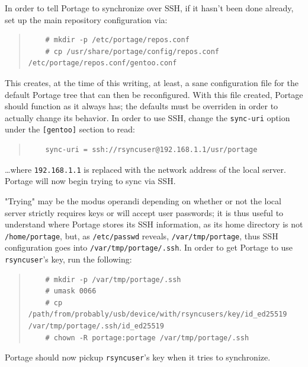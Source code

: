 \documentclass{article}
\begin{document}
In order to tell Portage to synchronize over SSH, if it hasn't been done already, set up the main repository configuration via:
\begin{quote}
\begin{verbatim}
	# mkdir -p /etc/portage/repos.conf
	# cp /usr/share/portage/config/repos.conf /etc/portage/repos.conf/gentoo.conf
\end{verbatim}
\end{quote}
This creates, at the time of this writing, at least, a sane configuration file for the default Portage tree that can then be reconfigured.  With this file created, Portage should function as it always has; the defaults must be overriden in order to actually change its behavior. In order to use SSH, change the \texttt{sync-uri} option under the \texttt{[gentoo]} section to read:
\begin{quote}
\begin{verbatim}
	sync-uri = ssh://rsyncuser@192.168.1.1/usr/portage
\end{verbatim}
\end{quote}
\ldots where \texttt{192.168.1.1} is replaced with the network address of the local server.  Portage will now begin trying to sync via SSH.

"Trying" may be the modus operandi depending on whether or not the local server strictly requires keys or will accept user passwords; it is thus useful to understand where Portage stores its SSH information, as its home directory is not \texttt{/home/portage}, but, as \texttt{/etc/passwd} reveals, \texttt{/var/tmp/portage}, thus SSH configuration goes into \texttt{/var/tmp/portage/.ssh}.  In order to get Portage to use \texttt{rsyncuser}'s key, run the following:
\begin{quote}
\begin{verbatim}
	# mkdir -p /var/tmp/portage/.ssh
	# umask 0066
	# cp /path/from/probably/usb/device/with/rsyncusers/key/id_ed25519 /var/tmp/portage/.ssh/id_ed25519
	# chown -R portage:portage /var/tmp/portage/.ssh
\end{verbatim}
\end{quote}
Portage should now pickup \texttt{rsyncuser}'s key when it tries to synchronize.
\end{document}
